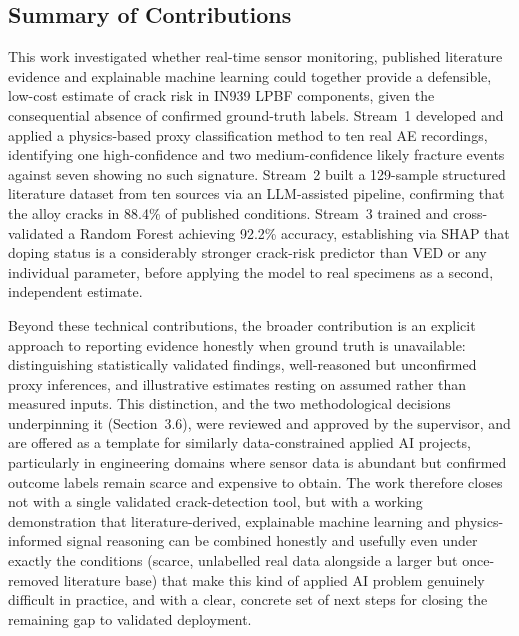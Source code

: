 \documentclass[a4paper]{article}
\begin{document}
\subsection{Summary of Contributions}
This work investigated whether real-time sensor monitoring, published literature evidence and explainable machine learning could together provide a defensible, low-cost estimate of crack risk in IN939 LPBF components, given the consequential absence of confirmed ground-truth labels. Stream~1 developed and applied a physics-based proxy classification method to ten real AE recordings, identifying one high-confidence and two medium-confidence likely fracture events against seven showing no such signature. Stream~2 built a 129-sample structured literature dataset from ten sources via an LLM-assisted pipeline, confirming that the alloy cracks in 88.4\% of published conditions. Stream~3 trained and cross-validated a Random Forest achieving 92.2\% accuracy, establishing via SHAP that doping status is a considerably stronger crack-risk predictor than VED or any individual parameter, before applying the model to real specimens as a second, independent estimate.

Beyond these technical contributions, the broader contribution is an explicit approach to reporting evidence honestly when ground truth is unavailable: distinguishing statistically validated findings, well-reasoned but unconfirmed proxy inferences, and illustrative estimates resting on assumed rather than measured inputs. This distinction, and the two methodological decisions underpinning it (Section~3.6), were reviewed and approved by the supervisor, and are offered as a template for similarly data-constrained applied AI projects, particularly in engineering domains where sensor data is abundant but confirmed outcome labels remain scarce and expensive to obtain. The work therefore closes not with a single validated crack-detection tool, but with a working demonstration that literature-derived, explainable machine learning and physics-informed signal reasoning can be combined honestly and usefully even under exactly the conditions (scarce, unlabelled real data alongside a larger but once-removed literature base) that make this kind of applied AI problem genuinely difficult in practice, and with a clear, concrete set of next steps for closing the remaining gap to validated deployment.
\end{document}
